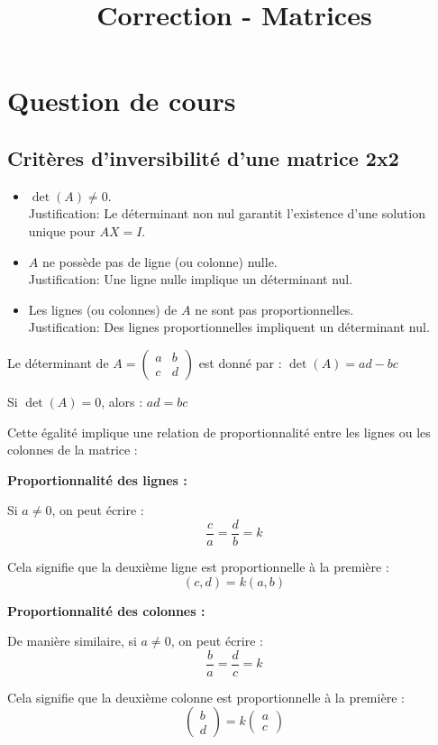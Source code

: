 \documentclass[10pt,a4paper]{article}
\title{Correction - Matrices}
\author{}
\date{}
\begin{document}
\maketitle

\section*{Question de cours}

\subsection*{Critères d'inversibilité d'une matrice 2x2}

\begin{itemize}
    \item $\det(A) \neq 0$. \\
    Justification: Le déterminant non nul garantit l'existence d'une solution unique pour $AX = I$.
    \item $A$ ne possède pas de ligne (ou colonne) nulle.\\
    Justification: Une ligne nulle implique un déterminant nul.
    \item Les lignes (ou colonnes) de $A$ ne sont pas proportionnelles.\\
    Justification: Des lignes proportionnelles impliquent un déterminant nul.
\end{itemize}

Le déterminant de $A = \begin{pmatrix} a & b \\ c & d \end{pmatrix}$ est donné par :
$ \det(A) = ad - bc $

Si $\det(A) = 0$, alors : $ ad = bc $

Cette égalité implique une relation de proportionnalité entre les lignes ou les colonnes de la matrice :

\textbf{Proportionnalité des lignes :}

Si $a \neq 0$, on peut écrire :
$$ \frac{c}{a} = \frac{d}{b} = k $$

Cela signifie que la deuxième ligne est proportionnelle à la première :
$$ (c,d) = k(a,b) $$

\textbf{Proportionnalité des colonnes :}

De manière similaire, si $a \neq 0$, on peut écrire :
$$ \frac{b}{a} = \frac{d}{c} = k $$

Cela signifie que la deuxième colonne est proportionnelle à la première :
$$ \begin{pmatrix} b \\ d \end{pmatrix} = k\begin{pmatrix} a \\ c \end{pmatrix} $$
\end{document}

